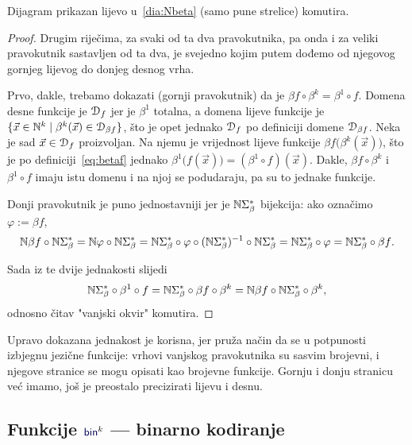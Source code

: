 \begin{lema}[{name=[brojevni-jezični-brojevni dijagram komutira]}]\label{lm:pravkomut}
Dijagram prikazan lijevo u~\eqref{dia:Nbeta} (samo pune strelice) komutira.
\end{lema}
\begin{proof}
Drugim riječima, za svaki od ta dva pravokutnika, pa onda i za veliki pravokutnik sastavljen od ta dva, je svejedno kojim putem dođemo od njegovog gornjeg lijevog do donjeg desnog vrha.

Prvo, dakle, trebamo dokazati (gornji pravokutnik) da je $\beta f\circ\beta^k =\beta^1\circ f$. Domena desne funkcije je $\mathcal D_{f}$ jer je $\beta^1$ totalna, a domena lijeve funkcije je $\{\vec x\in{\mathbb N}^k\mid\beta^k(\vec x)\in\mathcal D_{\beta f}\}$, što je opet jednako $\mathcal D_{f}$ po definiciji domene $\mathcal D_{\beta f}$. Neka je sad $\vec x\in\mathcal D_{f}$ proizvoljan. Na njemu je vrijednost lijeve funkcije $\beta f\bigl(\beta^k(\vec x)\bigr)$, što je po definiciji~\eqref{eq:betaf} jednako $\beta^1\bigl(f(\vec x)\bigr)=(\beta^1\circ f)(\vec x)$. Dakle, $\beta f\circ\beta^k$ i $\beta^1\circ f$ imaju istu domenu i na njoj se podudaraju, pa su to jednake funkcije.

Donji pravokutnik je puno jednostavniji jer je ${\mathbb N}\Sigma_\beta^*$ bijekcija: ako označimo $\varphi:=\beta f$,
\begin{equation}
    {\mathbb N}\beta f\circ{\mathbb N}\Sigma_\beta^*={\mathbb N}\varphi\circ{\mathbb N}\Sigma_\beta^*={\mathbb N}\Sigma_\beta^*\circ\varphi\circ({\mathbb N}\Sigma_\beta^*)^{-1}\circ{\mathbb N}\Sigma_\beta^*={\mathbb N}\Sigma_\beta^*\circ\varphi={\mathbb N}\Sigma_\beta^*\circ\beta f\text.
\end{equation}

Sada iz te dvije jednakosti slijedi
\begin{equation}\label{eq:pravkomut}
    {\mathbb N}\Sigma_\beta^*\circ\beta^1\circ f={\mathbb N}\Sigma_\beta^*\circ\beta f\circ\beta^k={\mathbb N}\beta f\circ{\mathbb N}\Sigma_\beta^*\circ\beta^k\text,
\end{equation}
odnosno čitav "\!vanjski okvir" komutira.
\end{proof}

Upravo dokazana jednakost je korisna, jer pruža način da se u potpunosti izbjegnu jezične funkcije: vrhovi vanjskog pravokutnika su sasvim brojevni, i njegove stranice se mogu opisati kao brojevne funkcije. Gornju i donju stranicu već imamo, još je preostalo precizirati lijevu i desnu.

\subsection{Funkcije \texorpdfstring{$\f{bin}^k$}{bin} --- binarno kodiranje}

